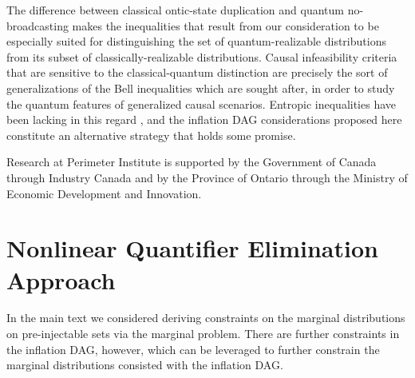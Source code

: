 The difference between classical ontic-state duplication and quantum no-broadcasting makes the inequalities that result from our consideration to be especially suited for distinguishing the set of quantum-realizable distributions from its subset of classically-realizable distributions. Causal infeasibility criteria that are sensitive to the classical-quantum distinction are precisely the sort of generalizations of the Bell inequalities which are sought after, in order to study the quantum features of generalized causal scenarios. Entropic inequalities have been lacking in this regard \cite{fritz2012bell,pusey2014gdag,Chaves2015infoquantum}, and the inflation DAG considerations proposed here constitute an alternative strategy that holds some promise.





\begin{acknowledgments}
Research at Perimeter Institute is supported by the Government of Canada through Industry Canada and by the Province of Ontario through the Ministry of Economic Development and Innovation.
\end{acknowledgments}


\onecolumngrid
\newpage
\appendix
\renewcommand{\theequation}{A-\arabic{equation}}
\setcounter{equation}{0}

\section{Nonlinear Quantifier Elimination Approach}\label{sec:nonlinearelimination}

In the main text we considered deriving constraints on the marginal distributions on pre-injectable sets via the marginal problem. There are further constraints in the inflation DAG, however, which can be leveraged to further constrain the marginal distributions consisted with the inflation DAG.

